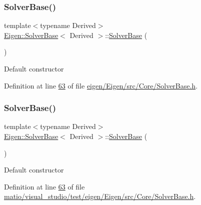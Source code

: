 \subsubsection{\texorpdfstring{Solver\+Base()}{SolverBase()}\hspace{0.1cm}{\footnotesize\ttfamily [1/2]}}
{\footnotesize\ttfamily template$<$typename Derived$>$ \\
\hyperlink{class_eigen_1_1_solver_base}{Eigen\+::\+Solver\+Base}$<$ Derived $>$\+::\hyperlink{class_eigen_1_1_solver_base}{Solver\+Base} (\begin{DoxyParamCaption}{ }\end{DoxyParamCaption})\hspace{0.3cm}{\ttfamily [inline]}}

Default constructor 

Definition at line \hyperlink{eigen_2_eigen_2src_2_core_2_solver_base_8h_source_l00063}{63} of file \hyperlink{eigen_2_eigen_2src_2_core_2_solver_base_8h_source}{eigen/\+Eigen/src/\+Core/\+Solver\+Base.\+h}.

\mbox{\label{class_eigen_1_1_solver_base_a4d5e5baddfba3790ab1a5f247dcc4dc1}} 
\subsubsection{\texorpdfstring{Solver\+Base()}{SolverBase()}\hspace{0.1cm}{\footnotesize\ttfamily [2/2]}}
{\footnotesize\ttfamily template$<$typename Derived$>$ \\
\hyperlink{class_eigen_1_1_solver_base}{Eigen\+::\+Solver\+Base}$<$ Derived $>$\+::\hyperlink{class_eigen_1_1_solver_base}{Solver\+Base} (\begin{DoxyParamCaption}{ }\end{DoxyParamCaption})\hspace{0.3cm}{\ttfamily [inline]}}

Default constructor 

Definition at line \hyperlink{matio_2visual__studio_2test_2eigen_2_eigen_2src_2_core_2_solver_base_8h_source_l00063}{63} of file \hyperlink{matio_2visual__studio_2test_2eigen_2_eigen_2src_2_core_2_solver_base_8h_source}{matio/visual\+\_\+studio/test/eigen/\+Eigen/src/\+Core/\+Solver\+Base.\+h}.



